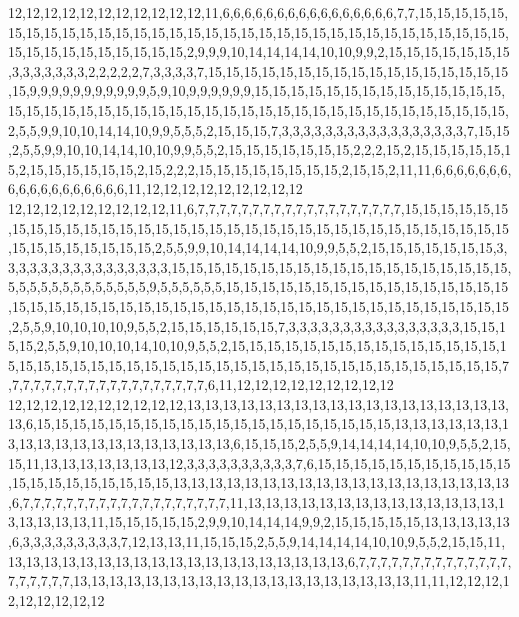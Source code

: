 12,12,12,12,12,12,12,12,12,12,12,11,6,6,6,6,6,6,6,6,6,6,6,6,6,6,6,6,7,7,15,15,15,15,15,15,15,15,15,15,15,15,15,15,15,15,15,15,15,15,15,15,15,15,15,15,15,15,15,15,15,15,15,15,15,15,15,15,15,15,15,15,15,2,9,9,9,10,14,14,14,14,10,10,9,9,2,15,15,15,15,15,15,15,3,3,3,3,3,3,3,2,2,2,2,2,7,3,3,3,3,7,15,15,15,15,15,15,15,15,15,15,15,15,15,15,15,15,15,15,9,9,9,9,9,9,9,9,9,9,9,5,9,10,9,9,9,9,9,9,15,15,15,15,15,15,15,15,15,15,15,15,15,15,15,15,15,15,15,15,15,15,15,15,15,15,15,15,15,15,15,15,15,15,15,15,15,15,15,15,15,15,2,5,5,9,9,10,10,14,14,10,9,9,5,5,5,2,15,15,15,7,3,3,3,3,3,3,3,3,3,3,3,3,3,3,3,3,3,7,15,15,2,5,5,9,9,10,10,14,14,10,10,9,9,5,5,2,15,15,15,15,15,15,15,2,2,2,15,2,15,15,15,15,15,15,2,15,15,15,15,15,15,2,15,2,2,2,15,15,15,15,15,15,15,15,2,15,15,2,11,11,6,6,6,6,6,6,6,6,6,6,6,6,6,6,6,6,6,6,11,12,12,12,12,12,12,12,12,12
12,12,12,12,12,12,12,12,12,11,6,7,7,7,7,7,7,7,7,7,7,7,7,7,7,7,7,7,7,7,15,15,15,15,15,15,15,15,15,15,15,15,15,15,15,15,15,15,15,15,15,15,15,15,15,15,15,15,15,15,15,15,15,15,15,15,15,15,15,15,15,15,2,5,5,9,9,10,14,14,14,14,10,9,9,5,5,2,15,15,15,15,15,15,15,3,3,3,3,3,3,3,3,3,3,3,3,3,3,3,3,15,15,15,15,15,15,15,15,15,15,15,15,15,15,15,15,15,15,15,5,5,5,5,5,5,5,5,5,5,5,5,5,9,5,5,5,5,5,5,15,15,15,15,15,15,15,15,15,15,15,15,15,15,15,15,15,15,15,15,15,15,15,15,15,15,15,15,15,15,15,15,15,15,15,15,15,15,15,15,15,15,15,15,2,5,5,9,10,10,10,10,9,5,5,2,15,15,15,15,15,15,7,3,3,3,3,3,3,3,3,3,3,3,3,3,3,3,3,15,15,15,15,2,5,5,9,10,10,10,14,10,10,9,5,5,2,15,15,15,15,15,15,15,15,15,15,15,15,15,15,15,15,15,15,15,15,15,15,15,15,15,15,15,15,15,15,15,15,15,15,15,15,15,15,15,15,15,15,15,7,7,7,7,7,7,7,7,7,7,7,7,7,7,7,7,7,7,7,6,11,12,12,12,12,12,12,12,12,12
12,12,12,12,12,12,12,12,12,12,13,13,13,13,13,13,13,13,13,13,13,13,13,13,13,13,13,13,13,6,15,15,15,15,15,15,15,15,15,15,15,15,15,15,15,15,15,15,15,15,13,13,13,13,13,13,13,13,13,13,13,13,13,13,13,13,13,13,13,6,15,15,15,2,5,5,9,14,14,14,14,10,10,9,5,5,2,15,15,11,13,13,13,13,13,13,13,12,3,3,3,3,3,3,3,3,3,3,7,6,15,15,15,15,15,15,15,15,15,15,15,15,15,15,15,15,15,15,15,15,13,13,13,13,13,13,13,13,13,13,13,13,13,13,13,13,13,13,13,6,7,7,7,7,7,7,7,7,7,7,7,7,7,7,7,7,7,7,7,11,13,13,13,13,13,13,13,13,13,13,13,13,13,13,13,13,13,13,13,11,15,15,15,15,15,2,9,9,10,14,14,14,9,9,2,15,15,15,15,15,13,13,13,13,13,6,3,3,3,3,3,3,3,3,3,7,12,13,13,11,15,15,15,2,5,5,9,14,14,14,14,10,10,9,5,5,2,15,15,11,13,13,13,13,13,13,13,13,13,13,13,13,13,13,13,13,13,13,13,6,7,7,7,7,7,7,7,7,7,7,7,7,7,7,7,7,7,7,7,7,13,13,13,13,13,13,13,13,13,13,13,13,13,13,13,13,13,13,13,11,11,12,12,12,12,12,12,12,12,12
